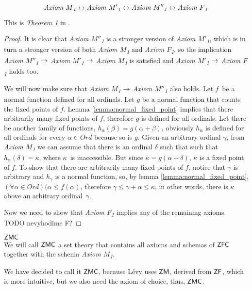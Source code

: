 \begin{theorem}
\begin{equation}
\emph{Axiom $M$\textsubscript{1}} \iff \emph{Axiom $M'$\textsubscript{1}} \iff \emph{Axiom $M''$\textsubscript{1}} \iff \emph{Axiom $F$\textsubscript{1}}
\end{equation}
\end{theorem}

This is \emph{Theorem 1} in \cite{Levy60a}.
\begin{proof}
It is clear that \emph{Axiom $M''$\textsubscript{1}} is a stronger version of \emph{Axiom $M'$\textsubscript{1}}, which is in turn a stronger version of both \emph{Axiom $M$\textsubscript{1}} and \emph{Axiom $F$\textsubscript{1}}, so the implication \emph{Axiom $M''$\textsubscript{1}} $\then$ \emph{Axiom $M'$\textsubscript{1}} $\then$ \emph{Axiom $M$\textsubscript{1}} is satisfied and \emph{Axiom $M'$\textsubscript{1}} $\then$ \emph{Axiom $F$\textsubscript{1}} holds too.

We will now make sure that  \emph{Axiom $M$\textsubscript{1}} $\then$  \emph{Axiom $M''$\textsubscript{1}} also holds. 
Let $f$ be a normal function defined for all ordinals. %
Let $g$ be a normal function that counts the fixed points of $f$. Lemma \ref{lemma:normal_fixed_point} implies that there arbitrarily many fixed points of $f$, therefore $g$ is defined for all ordinals. Let there be another family of functions, $h_\alpha(\beta) = g(\alpha+\beta)$, obviously $h_\alpha$ is defined for all ordinals for every $\alpha \in Ord$ because so is $g$. Given an arbitrary ordinal $\gamma$, from \emph{Axiom $M$\textsubscript{1}} we can assume that there is an ordinal $\delta$ such that such that $h_\alpha(\delta) = \kappa$, where $\kappa$ is inaccessible. 
But since $\kappa = g(\alpha+\delta)$, $\kappa$ is a fixed point of $f$. To show that there are arbitrarily many fixed points of $f$, notice that $\gamma$ is arbitrary and $h_\gamma$ is a normal function, so, by lemma \ref{lemma:normal_fixed_point}, $(\forall \alpha \in Ord)(\alpha \leq f(\alpha)$, therefore $\gamma \leq \gamma + \alpha \leq \kappa$, in other words, there is $\kappa$ above an arbitrary ordinal $\gamma$.

Now we need to show that \emph{Axiom $F$\textsubscript{1}} implies any of the remaining axioms.
TODO nevyhodime F?
\end{proof}

\begin{definition}{$\sf{ZMC}$}\\
We will call $\sf{ZMC}$ a set theory that contains all axioms and schemas of $\sf{ZFC}$ together with the schema \emph{Axiom $M$\textsubscript{1}}.
\end{definition}
We have decided to call it $\sf{ZMC}$, because Lévy uses $\sf{ZM}$, derived from $\sf{ZF}$, which is more intuitive, but we also need the axiom of choice, thus, $\sf{ZMC}$.


